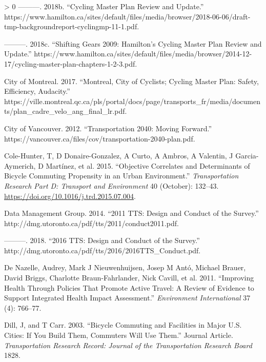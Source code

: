 \documentclass[smallextended]{svjour3}       %
\newlength{\cslhangindent}
\newenvironment{CSLReferences}[3] %
 {%
  \setlength{\parindent}{0pt}
  \ifodd #1 \everypar{\setlength{\hangindent}{\cslhangindent}}\ignorespaces\fi
  \ifnum #2 > 0
  \setlength{\parskip}{#2\baselineskip}
  \fi
 }%
 {}
\begin{document}
\begin{CSLReferences}{1}{0}
\leavevmode\hypertarget{ref-Cmp2018}{}%
---------. 2018b. {``Cycling Master Plan Review and Update.''}
https://www.hamilton.ca/sites/default/files/media/browser/2018-06-06/draft-tmp-backgroundreport-cyclingmp-11-1.pdf.

\leavevmode\hypertarget{ref-Cmp2009}{}%
---------. 2018c. {``Shifting Gears 2009: {Hamilton}'s Cycling Master
Plan Review and Update.''}
https://www.hamilton.ca/sites/default/files/media/browser/2014-12-17/cycling-master-plan-chapters-1-2-3.pdf.

\leavevmode\hypertarget{ref-Montreal2017}{}%
City of Montreal. 2017. {``Montreal, City of Cyclists; Cycling Master
Plan: {Safety}, Efficiency, Audacity.''}
https://ville.montreal.qc.ca/pls/portal/docs/page/transports\_fr/media/documents/plan\_cadre\_velo\_ang\_final\_lr.pdf.

\leavevmode\hypertarget{ref-Vancouver2012}{}%
City of Vancouver. 2012. {``Transportation 2040: {Moving} Forward.''}
https://vancouver.ca/files/cov/transportation-2040-plan.pdf.

\leavevmode\hypertarget{ref-ColeHunter2015}{}%
Cole-Hunter, T, D Donaire-Gonzalez, A Curto, A Ambros, A Valentin, J
Garcia-Aymerich, D Martínez, et al. 2015. {``Objective Correlates and
Determinants of Bicycle Commuting Propensity in an Urban Environment.''}
\emph{Transportation Research Part D: Transport and Environment} 40
(October): 132--43. \url{https://doi.org/10.1016/j.trd.2015.07.004}.

\leavevmode\hypertarget{ref-Dmg2014tts}{}%
Data Management Group. 2014. {``2011 {TTS}: {Design} and Conduct of the
Survey.''} http://dmg.utoronto.ca/pdf/tts/2011/conduct2011.pdf.

\leavevmode\hypertarget{ref-Dmg2018tts}{}%
---------. 2018. {``2016 {TTS}: {Design} and Conduct of the Survey.''}
http://dmg.utoronto.ca/pdf/tts/2016/2016TTS\_Conduct.pdf.

\leavevmode\hypertarget{ref-deNazelle2011}{}%
De Nazelle, Audrey, Mark J Nieuwenhuijsen, Josep M Antó, Michael Brauer,
David Briggs, Charlotte Braun-Fahrlander, Nick Cavill, et al. 2011.
{``Improving Health Through Policies That Promote Active Travel: A
Review of Evidence to Support Integrated Health Impact Assessment.''}
\emph{Environment International} 37 (4): 766--77.

\leavevmode\hypertarget{ref-Dill2003}{}%
Dill, J, and T Carr. 2003. {``Bicycle Commuting and Facilities in Major
{U}.{S}. Cities: {If} You Build Them, Commuters Will Use Them.''}
Journal Article. \emph{Transportation Research Record: Journal of the
Transportation Research Board} 1828.


\end{CSLReferences}
\end{document}
